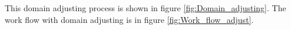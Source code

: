 \documentclass[conference,compsoc]{IEEEtran}
\begin{document}
This domain adjusting process is shown in figure \ref{fig:Domain_adjusting}.
The work flow with domain adjusting is in figure \ref{fig:Work_flow_adjust}.
\end{document}
